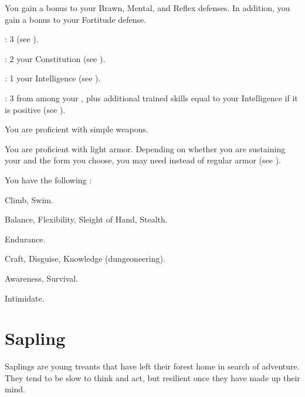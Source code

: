       You gain a  bonus to your Brawn, Mental, and Reflex defenses.
      In addition, you gain a  bonus to your Fortitude defense.

      \begin{raggeditemize}
          \item {}: 3 (see ).
          \item {}: 2 \add your Constitution (see ).
          \item {}: 1 \add your Intelligence (see ).
          \item {}: 3 from among your , plus additional trained skills equal to your Intelligence if it is positive (see ).
      \end{raggeditemize}

      You are proficient with simple weapons.

      You are proficient with light armor.
      Depending on whether you are sustaining your  and the form you choose, you may need  instead of regular armor (see ).

      You have the following :
      \begin{raggeditemize}
        \item {} Climb, Swim.
        \item {} Balance, Flexibility, Sleight of Hand, Stealth.
        \item {} Endurance.
        \item {} Craft, Disguise, Knowledge (dungeoneering).
        \item {} Awareness, Survival.
        \item {} Intimidate.
      \end{raggeditemize}

\section{Sapling}

  Saplings are young treants that have left their forest home in search of adventure.
  They tend to be slow to think and act, but resilient once they have made up their mind.

